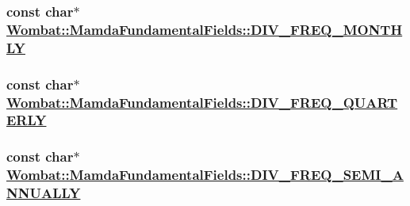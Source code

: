 \hypertarget{classWombat_1_1MamdaFundamentalFields_6b199a67a194b6d26687ebdb5de2b55f}{
\subsubsection[DIV\_\-FREQ\_\-MONTHLY]{\setlength{\rightskip}{0pt plus 5cm}const char$\ast$ \hyperlink{classWombat_1_1MamdaFundamentalFields_6b199a67a194b6d26687ebdb5de2b55f}{Wombat::Mamda\-Fundamental\-Fields::DIV\_\-FREQ\_\-MONTHLY}}}
\label{classWombat_1_1MamdaFundamentalFields_6b199a67a194b6d26687ebdb5de2b55f}


\hypertarget{classWombat_1_1MamdaFundamentalFields_bc4ece377aa2d6e4a9939b571910f4a3}{
\subsubsection[DIV\_\-FREQ\_\-QUARTERLY]{\setlength{\rightskip}{0pt plus 5cm}const char$\ast$ \hyperlink{classWombat_1_1MamdaFundamentalFields_bc4ece377aa2d6e4a9939b571910f4a3}{Wombat::Mamda\-Fundamental\-Fields::DIV\_\-FREQ\_\-QUARTERLY}}}
\label{classWombat_1_1MamdaFundamentalFields_bc4ece377aa2d6e4a9939b571910f4a3}


\hypertarget{classWombat_1_1MamdaFundamentalFields_2b9fcf02ec4ba93aa98ae2246e7120eb}{
\subsubsection[DIV\_\-FREQ\_\-SEMI\_\-ANNUALLY]{\setlength{\rightskip}{0pt plus 5cm}const char$\ast$ \hyperlink{classWombat_1_1MamdaFundamentalFields_2b9fcf02ec4ba93aa98ae2246e7120eb}{Wombat::Mamda\-Fundamental\-Fields::DIV\_\-FREQ\_\-SEMI\_\-ANNUALLY}}}
\label{classWombat_1_1MamdaFundamentalFields_2b9fcf02ec4ba93aa98ae2246e7120eb}


